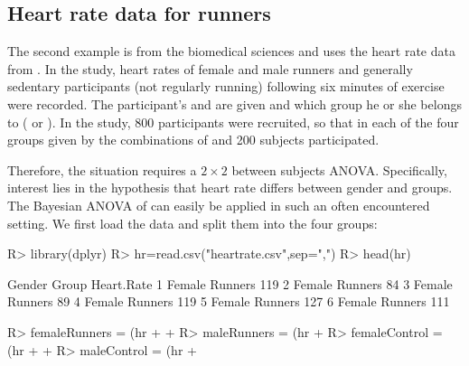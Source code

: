 \subsection{Heart rate data for runners}
The second example is from the biomedical sciences and uses the heart rate data from \cite{Moore2012}. In the study, heart rates of female and male runners and generally sedentary participants (not regularly running) following six minutes of exercise were recorded. The participant's  and  are given and which group he or she belongs to ( or ). In the study, 800 participants were recruited, so that in each of the four groups given by the combinations of  and  200 subjects participated.

Therefore, the situation requires a $2\times 2$ between subjects ANOVA. Specifically, interest lies in the hypothesis that heart rate differs between gender and groups. The Bayesian ANOVA of  can easily be applied in such an often encountered setting. We first load the data and split them into the four groups:
\begin{example}
R> library(dplyr)
R> hr=read.csv("heartrate.csv",sep=",")
R> head(hr)

  Gender   Group Heart.Rate
1 Female Runners        119
2 Female Runners         84
3 Female Runners         89
4 Female Runners        119
5 Female Runners        127
6 Female Runners        111

R> femaleRunners = (hr %
+  %
+  %
R> maleRunners = (hr %
+  %
R> femaleControl = (hr %
+  %
+  %
R> maleControl = (hr %
+  %
\end{example}

